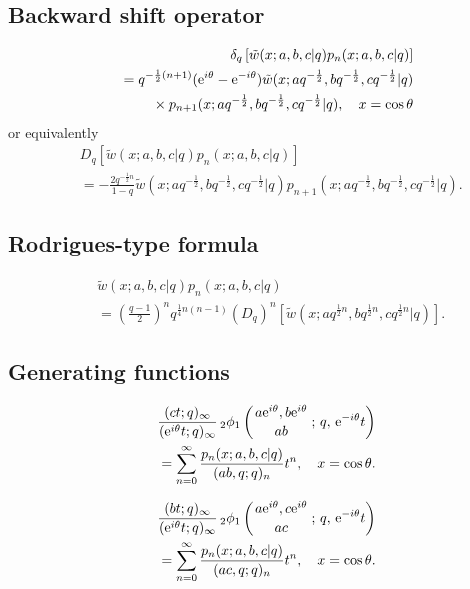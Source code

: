 \documentclass[envcountchap,graybox]{svmono}
\newcommand{\qhyp}[5]{\mbox{}_{#1}{\phi}_{#2}
\left(\genfrac{}{}{0pt}{}{#3}{#4}\,;\,q,\,#5\right)}
\newcommand{\mathindent}{\hspace{7.5mm}}
\newcommand{\e}{\textrm{e}}
\newcommand{\qhyp}[5]{\,\mbox{}_{#1}\phi_{#2}\!\left(
  \genfrac{}{}{0pt}{}{#3}{#4};#5\right)}
\begin{document}
\subsection*{Backward shift operator}
\begin{eqnarray}
\label{shift2ContDualqHahnI}
& &\delta_q\left[{\tilde w}(x;a,b,c|q)p_n(x;a,b,c|q)\right]\nonumber\\
& &{}=q^{-\frac{1}{2}(n+1)}(\e^{i\theta}-\e^{-i\theta})
{\tilde w}(x;aq^{-\frac{1}{2}},bq^{-\frac{1}{2}},cq^{-\frac{1}{2}}|q)\nonumber\\
& &{}\mathindent{}\times p_{n+1}(x;aq^{-\frac{1}{2}},bq^{-\frac{1}{2}},cq^{-\frac{1}{2}}|q),
\quad x=\cos\theta
\end{eqnarray}
or equivalently
\begin{eqnarray}
\label{shift2ContDualqHahnII}
& &D_q\left[{\tilde w}(x;a,b,c|q)p_n(x;a,b,c|q)\right]\nonumber\\
& &{}=-\frac{2q^{-\frac{1}{2}n}}{1-q}{\tilde w}(x;aq^{-\frac{1}{2}},bq^{-\frac{1}{2}},cq^{-\frac{1}{2}}|q)
p_{n+1}(x;aq^{-\frac{1}{2}},bq^{-\frac{1}{2}},cq^{-\frac{1}{2}}|q).
\end{eqnarray}

\subsection*{Rodrigues-type formula}
\begin{eqnarray}
\label{RodContDualqHahn}
& &{\tilde w}(x;a,b,c|q)p_n(x;a,b,c|q)\nonumber\\
& &{}=\left(\frac{q-1}{2}\right)^nq^{\frac{1}{4}n(n-1)}\left(D_q\right)^n\left[{\tilde w}(x;aq^{\frac{1}{2}n},bq^{\frac{1}{2}n},cq^{\frac{1}{2}n}|q)\right].
\end{eqnarray}

\subsection*{Generating functions}
\begin{eqnarray}
\label{GenContDualqHahn1}
& &\frac{(ct;q)_{\infty}}{(\e^{i\theta}t;q)_{\infty}}\,
\qhyp{2}{1}{a\e^{i\theta},b\e^{i\theta}}{ab}{\e^{-i\theta}t}\nonumber\\
& &{}=\sum_{n=0}^{\infty}\frac{p_n(x;a,b,c|q)}{(ab,q;q)_n}t^n,
\quad x=\cos\theta.
\end{eqnarray}

\begin{eqnarray}
\label{GenContDualqHahn2}
& &\frac{(bt;q)_{\infty}}{(\e^{i\theta}t;q)_{\infty}}\,
\qhyp{2}{1}{a\e^{i\theta},c\e^{i\theta}}{ac}{\e^{-i\theta}t}\nonumber\\
& &{}=\sum_{n=0}^{\infty}\frac{p_n(x;a,b,c|q)}{(ac,q;q)_n}t^n,
\quad x=\cos\theta.
\end{eqnarray}
\end{document}
